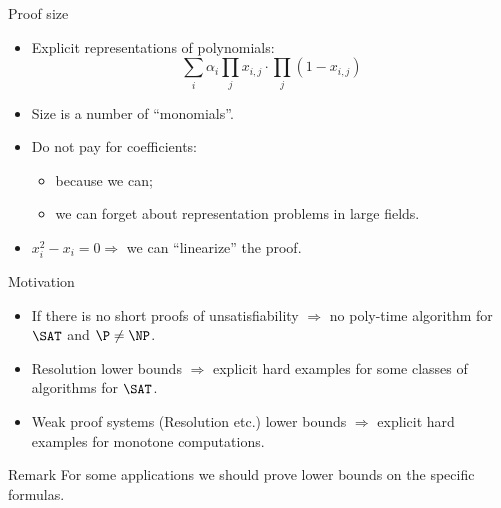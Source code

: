 \begin{frame}{Proof size}
    \begin{itemize}
        \item Explicit representations of polynomials:
            $$
                \sum\limits_{i} \alpha_i \prod\limits_{j} x_{i, j} \cdot \prod\limits_{j} (1 - x_{i, j})
            $$
        \pause
        \item Size is a number of ``monomials''.
        \pause
        \item Do \alert{not} pay for coefficients:
            \begin{itemize}
                \item because we can;
                \pause
                \item we can forget about representation problems in large fields.
            \end{itemize}
        \pause
        \item $x_i^2 - x_i = 0 \Rightarrow$ we can ``linearize'' the proof.
    \end{itemize}
    
\end{frame}

\begin{frame}{Motivation}

    \begin{itemize}
        \item If there is no short proofs of unsatisfiability $\Rightarrow$ no poly-time algorithm for
            $\SAT$ and $\P \neq \NP$.
        \pause
        \item Resolution lower bounds $\Rightarrow$ explicit hard examples for some classes of algorithms
            for $\SAT$.
        \pause
        \item Weak proof systems (Resolution etc.) lower bounds $\Rightarrow$ explicit hard examples for
            \alert{monotone} computations.
    \end{itemize}

    \pause
    \vspace{1cm}
    \begin{block}{Remark}
        For some applications we should prove lower bounds on the specific formulas.        
    \end{block}
\end{frame}

